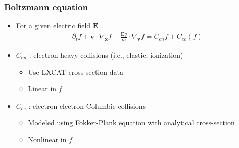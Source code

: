 \documentclass[mathserif, aspectratio=169]{beamer}
\newcommand{\vect}[1]{\boldsymbol{#1}}
\newcommand{\myint}{\int\limits}
\newcommand{\diff}[1]{\, d#1}
\begin{document}
\begin{frame}
	\frametitle{Boltzmann equation}
	\begin{itemize}
		\item For a given electric field $\vect{E}$
		\begin{align}
			\partial_t f  + \vect{v} \cdot \nabla_{\vect{x}} f -\frac{\vect{E} q}{m} \cdot \nabla_{\vect{v }}f = C_{en}f + C_{ee}(f)
		\end{align}
		\item $C_{en}$ : electron-heavy collisions (i.e., elastic, ionization)
		\begin{itemize}
			\item Use LXCAT cross-section data 
			\item Linear in $f$
		\end{itemize} 
		\item $C_{ee}$ : electron-electron Columbic collisions 
		\begin{itemize}
			\item Modeled using Fokker-Plank equation with analytical cross-section
			\item Nonlinear in $f$
		\end{itemize}
	\end{itemize}
\end{frame}
\end{document}
